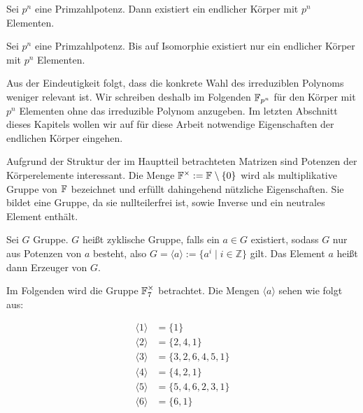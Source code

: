 \begin{satz}[Existenzsatz]
    Sei $p^n$ eine Primzahlpotenz. Dann existiert ein endlicher Körper mit $p^n$ Elementen. 
\end{satz}

\begin{satz}[Eindeutigkeitssatz]
    Sei $p^n$ eine Primzahlpotenz. Bis auf Isomorphie existiert nur ein endlicher Körper mit $p^n$ Elementen.
\end{satz}

Aus der Eindeutigkeit folgt, dass die konkrete Wahl des irreduziblen Polynoms weniger relevant ist. Wir schreiben deshalb im Folgenden $\field{p}[n]$ für den Körper mit $p^n$ Elementen ohne das irreduzible Polynom anzugeben. Im letzten Abschnitt dieses Kapitels wollen wir auf für diese Arbeit notwendige Eigenschaften der endlichen Körper eingehen.


Aufgrund der Struktur der im Hauptteil betrachteten Matrizen sind Potenzen der Körperelemente interessant. Die Menge $\field{}^\times := \field{} \setminus \{0\}$ wird als multiplikative Gruppe von $\field{}$ bezeichnet und erfüllt dahingehend nützliche Eigenschaften. Sie bildet eine Gruppe, da sie nullteilerfrei ist, sowie Inverse und ein neutrales Element enthält.

\begin{definition}
    Sei $G$ Gruppe. $G$ heißt zyklische Gruppe, falls ein $a \in G$ existiert, sodass $G$ nur aus Potenzen von $a$ besteht, also $G = \langle a \rangle := \{ a^i \mid i \in \mathbb{Z}\}$ gilt. Das Element $a$ heißt dann Erzeuger von $G$.
\end{definition}

Im Folgenden wird die Gruppe $\field{7}^\times$ betrachtet. Die Mengen $\langle a \rangle$ sehen wie folgt aus:

\begin{align*}
    \langle 1 \rangle &= \{ 1\} \\
    \langle 2 \rangle &= \{ 2,4,1\} \\
    \langle 3 \rangle &= \{ 3,2,6,4,5,1\} \\
    \langle 4 \rangle &= \{ 4,2,1\} \\
    \langle 5 \rangle &= \{ 5,4,6,2,3,1\} \\
    \langle 6 \rangle &= \{ 6,1\} \\
\end{align*}

